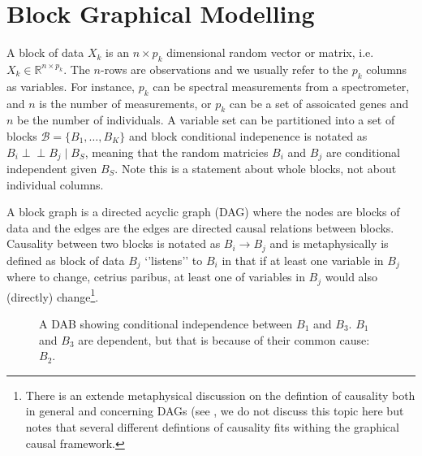 \documentclass[10pt,leqno]{amsart}
\newcommand{\ci}{\perp\!\!\!\perp}          %
\begin{document}
\section{Block Graphical Modelling}
A block of data $X_k$ is an $n \times p_k$ dimensional random vector or matrix, i.e. $X_k\in\mathbb{R}^{n\times p_k}$. The $n$-rows are observations and we usually refer to the $p_k$ columns as variables. For instance,  $p_k$ can be spectral measurements from a spectrometer, and $n$ is the number of measurements, or $p_k$ can be a set of assoicated genes and $n$ be the number of individuals. A variable set can be partitioned into a set of blocks  $\mathcal{B}=\{B_1,\dots,B_K\}$ and block conditional indepenence is notated as $B_i \ci B_j \mid B_S$, meaning that the random matricies  $B_i$  and  $B_j$ are conditional independent given $B_S$.  Note this is a statement about whole
  blocks, not about individual columns.   
  
 A block graph is a directed acyclic graph (DAG) where the nodes are blocks of data and the edges are the edges are directed causal relations between blocks. Causality between two blocks is notated as $B_i \rightarrow B_j$ and is metaphysically is defined as block of data $B_j$ `'listens'' to $B_i$ in that if at least one variable in $B_j$ where to change, cetrius paribus, at least one of variables in $B_j$ would also (directly) change\footnote{There is an extende metaphysical discussion on the defintion of causality both in general and concerning DAGs (see \cite{Pearl, Heckman, }, we do not discuss this topic here but notes that several different defintions of causality fits withing the graphical causal framework. }. 
 
 
 \begin{figure}[H]
\centering
{}
\caption{A DAB showing conditional independence between $B_1$ and $B_3$. $B_1$ and $B_3$ are dependent, but that is because of their common cause: $B_2$.}
\label{fig:fork}
\end{figure}
 
\end{document}
